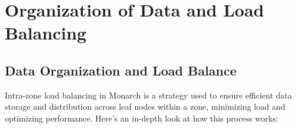 


\section{Organization of Data and Load Balancing}

\subsection{Data Organization and Load Balance}

Intra-zone load balancing in Monarch is a strategy used to ensure efficient data storage and distribution across leaf nodes within a zone, minimizing load and optimizing performance. Here’s an in-depth look at how this process works:

